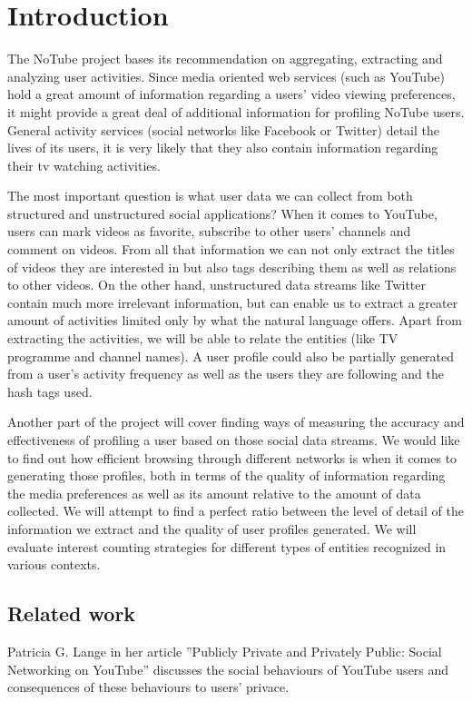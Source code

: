 \section{Introduction}

The NoTube project bases its recommendation on aggregating, extracting and analyzing user activities. Since media oriented web services (such as YouTube) hold a great amount of information regarding a users' video viewing preferences, it might provide a great deal of additional information for profiling NoTube users. General activity services (social networks like Facebook or Twitter) detail the lives of its users, it is very likely that they also contain information regarding their tv watching activities.

The most important question is what user data we can collect from both structured and unstructured social applications? When it comes to YouTube, users can mark videos as favorite, subscribe to other users' channels and comment on videos. From all that information we can not only extract the titles of videos they are interested in but also tags describing them as well as relations to other videos. On the other hand, unstructured data streams like Twitter contain much more irrelevant information, but can enable us to extract a greater amount of activities limited only by what the natural language offers. Apart from extracting the activities, we will be able to relate the entities (like TV programme and channel names). A user profile could also be partially generated from a user's activity frequency as well as the users they are following and the hash tags used.

Another part of the project will cover finding ways of measuring the accuracy and effectiveness of profiling a user based on those social data streams. We would like to find out how efficient browsing through different networks is when it comes to generating those profiles, both in terms of the quality of information regarding the media preferences as well as its amount relative to the amount of data collected. We will attempt to find a perfect ratio between the level of detail of the information we extract and the quality of user profiles generated. We will evaluate interest counting strategies for different types of entities recognized in various contexts.

\subsection{Related work}
Patricia G. Lange in her article ''Publicly Private and Privately Public: Social
Networking on YouTube'' discusses the social behaviours of YouTube users and
consequences of these behaviours to users' privace.

